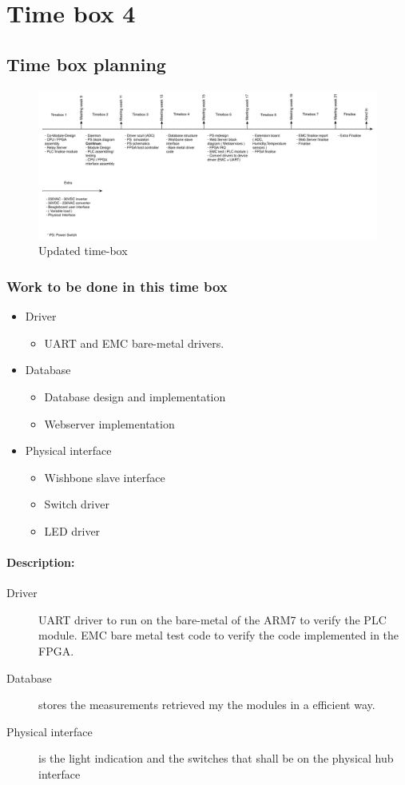 \section{Time box 4}
\subsection{Time box planning}
\begin{figure}[H]
	\begin{centering}
		\includegraphics[width=1.0\textwidth]{images/tb_r4.pdf}
		\caption{Updated time-box}
	\end{centering}
\end{figure}
\subsubsection{Work to be done in this time box}
\begin{itemize}
	\item Driver
	\begin{itemize}
		\item UART and EMC bare-metal drivers.
	\end{itemize}
	\item Database
	\begin{itemize}
		\item Database design and implementation
		\item Webserver implementation
	\end{itemize}
	\item Physical interface
	\begin{itemize}
		\item Wishbone slave interface
		\item Switch driver
		\item LED driver
	\end{itemize}
\end{itemize}
\paragraph{Description:}
\begin{description}
	\item[Driver] UART driver to run on the bare-metal of the ARM7 to verify the PLC module. EMC bare metal test code to verify the code implemented in the FPGA.
	\item[Database] stores the measurements retrieved my the modules in a efficient way.
	\item[Physical interface] is the light indication and the switches that shall be on the physical hub interface
\end{description}
